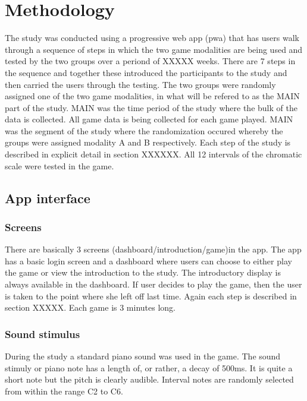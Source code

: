 \chapter{Methodology}
The study was conducted using a progressive web app (pwa) that has users walk through a sequence of steps in which the two game modalities are being used and tested by the two groups over a periond of XXXXX weeks. There are 7 steps in the sequence and together these introduced the participants to the study and then carried the users through the testing. The two groups were randomly assigned one of the two game modalities, in what will be refered to as the MAIN part of the study. MAIN was the time period of the study where the bulk of the data is collected. All game data is being collected for each game played. MAIN was the segment of the study where the randomization occured whereby the groups were assigned modality A and B respectively. Each step of the study is described in explicit detail in section XXXXXX. All 12 intervals of the chromatic scale were tested in the game.



\section{App interface}
\subsection{Screens}
There are basically 3 screens (dashboard/introduction/game)in the app. The app has a basic login screen and a dashboard where users can choose to either play the game or view the introduction to the study. The introductory display is always available in the dashboard. If user decides to play the game, then the user is taken to the point where she left off last time. Again each step is described in section XXXXX. Each game is 3 minutes long.

\subsection{Sound stimulus}
During the study a standard piano sound was used in the game. The sound stimuly or piano note has a length of, or rather, a decay of 500ms. It is quite a short note but the pitch is clearly audible. Interval notes are randomly selected from within the range C2 to C6.

